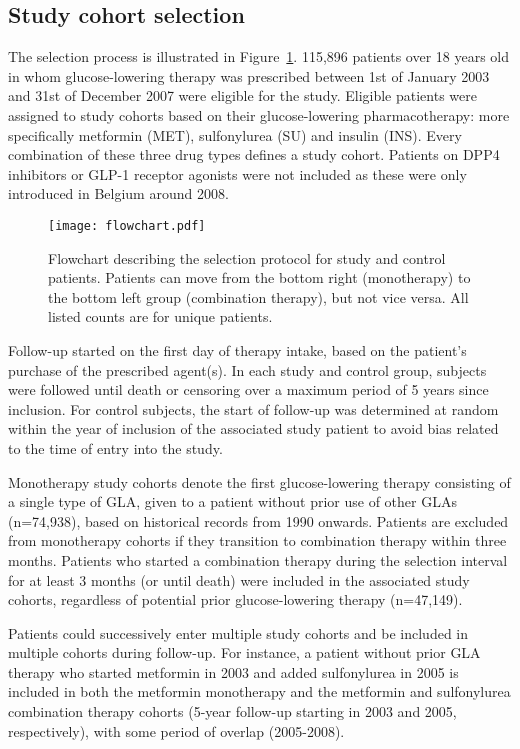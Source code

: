 \subsection{Study cohort selection}
The selection process is illustrated in Figure~\ref{fig:survival-selection}. 115,896 patients over 18 years old in whom glucose-lowering therapy was prescribed between 1st of January 2003 and 31st of December 2007 were eligible for the study. Eligible patients were assigned to study cohorts based on their glucose-lowering pharmacotherapy: more specifically metformin (MET), sulfonylurea (SU) and insulin (INS). Every combination of these three drug types defines a study cohort. Patients on DPP4 inhibitors or GLP-1 receptor agonists were not included as these were only introduced in Belgium around 2008. 

\begin{figure}[!p]
  \centering 
      \texttt{[image: flowchart.pdf]} 
  \caption{Flowchart describing the selection protocol for study and control patients. Patients can move
from the bottom right (monotherapy) to the bottom left group (combination therapy), but not vice
versa. All listed counts are for unique patients.}\label{fig:survival-selection}
\end{figure}

Follow-up started on the first day of therapy intake, based on the patient's purchase of the prescribed agent(s). In each study and control group, subjects were followed until death or censoring over a maximum period of 5 years since inclusion. For control subjects, the start of follow-up was determined at random within the year of inclusion of the associated study patient to avoid bias related to the time of entry into the study.

Monotherapy study cohorts denote the first glucose-lowering therapy consisting of a single type of GLA, given to a patient without prior use of other GLAs (n=74,938), based on historical records from 1990 onwards. Patients are excluded from monotherapy cohorts if they transition to combination therapy within three months. Patients who started a combination therapy during the selection interval for at least 3 months (or until death) were included in the associated study cohorts, regardless of potential prior glucose-lowering therapy (n=47,149). 

Patients could successively enter multiple study cohorts and be included in multiple cohorts during follow-up. For instance, a patient without prior GLA therapy who started metformin in 2003 and added sulfonylurea in 2005 is included in both the metformin monotherapy and the metformin and sulfonylurea combination therapy cohorts (5-year follow-up starting in 2003 and 2005, respectively), with some period of overlap (2005-2008).  

